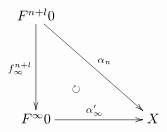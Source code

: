 \documentclass[12pt]{article}
\begin{document}
\pagestyle{empty}

\begin{align*}
  \vcenter{
    \xymatrix@=60pt{
      F^{n + l} 0
      \ar@{->}[rd]^{\alpha_n}
      \ar@{->}[d]_{f^{n + l}_\infty}
      \ar@/_20pt/@{{}{ }{}}[rd]|{\circlearrowright}
      \\
      F^\infty 0
      \ar@{->}[r]^{\alpha'_\infty}
      &
      X
    }
  }
\end{align*}
\end{document}
